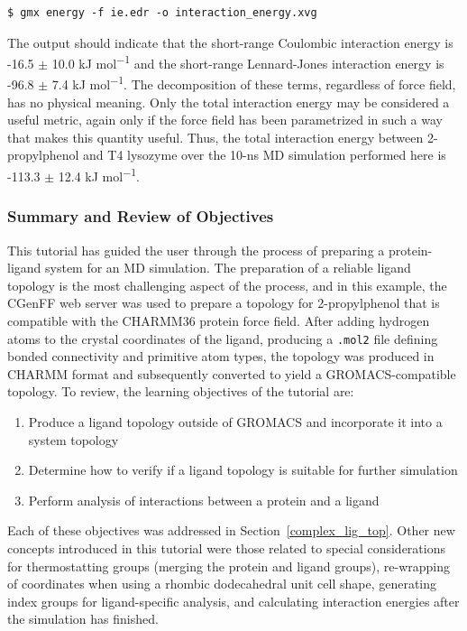\documentclass[9pt,tutorial,pubversion]{livecoms}
\begin{document}
\begin{lstlisting}
$ gmx energy -f ie.edr -o interaction_energy.xvg
\end{lstlisting}
%
The output should indicate that the short-range Coulombic interaction energy is -16.5 $\pm$ 10.0 kJ mol\textsuperscript{$-$1} and the short-range Lennard-Jones interaction energy is -96.8 $\pm$ 7.4 kJ mol\textsuperscript{$-$1}. The decomposition of these terms, regardless of force field, has no physical meaning. Only the total interaction energy may be considered a useful metric, again only if the force field has been parametrized in such a way that makes this quantity useful. Thus, the total interaction energy between 2-propylphenol and T4 lysozyme over the 10-ns MD simulation performed here is -113.3 $\pm$ 12.4 kJ mol\textsuperscript{$-$1}.

\subsubsection{Summary and Review of Objectives} \label{prot_lig_summary}

This tutorial has guided the user through the process of preparing a protein-ligand system for an MD simulation. The preparation of a reliable ligand topology is the most challenging aspect of the process, and in this example, the  CGenFF web server was used to prepare a topology for 2-propylphenol that is compatible with the CHARMM36 protein force field. After adding hydrogen atoms to the crystal coordinates of the ligand, producing a \texttt{.mol2} file defining bonded connectivity and primitive atom types, the topology was produced in CHARMM format and subsequently converted to yield a GROMACS-compatible topology.  To review, the learning objectives of the tutorial are:

\begin{enumerate}
	\item Produce a ligand topology outside of GROMACS and incorporate it into a system topology
	\item Determine how to verify if a ligand topology is suitable for further simulation
	\item Perform analysis of interactions between a protein and a ligand
\end{enumerate}

Each of these objectives was addressed in Section~\ref{complex_lig_top}. Other new concepts introduced in this tutorial were those related to special considerations for thermostatting groups (merging the protein and ligand groups), re-wrapping of coordinates when using a rhombic dodecahedral unit cell shape, generating index groups for ligand-specific analysis, and calculating interaction energies after the simulation has finished.
\end{document}
